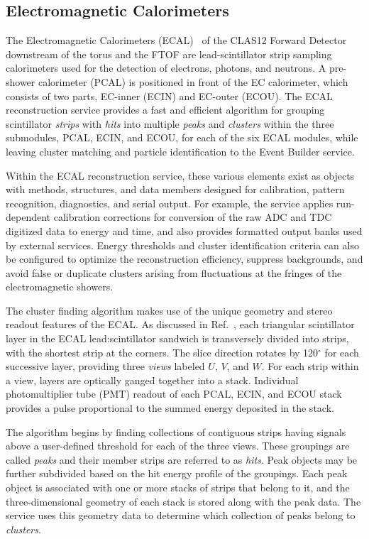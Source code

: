 \subsection{Electromagnetic Calorimeters}

The Electromagnetic Calorimeters (ECAL)~\cite{ecal-nim} of the CLAS12 Forward Detector downstream of the
torus and the FTOF are lead-scintillator strip sampling calorimeters used for the detection of electrons, photons,
and neutrons. A pre-shower calorimeter (PCAL) is positioned in front of the EC calorimeter, which consists of two
parts, EC-inner (ECIN) and EC-outer (ECOU). The ECAL reconstruction service provides a fast
and efficient algorithm for grouping scintillator {\it strips} with {\it hits} into multiple {\it peaks} and {\it clusters}
within the three submodules, PCAL, ECIN, and ECOU, for each of the six ECAL modules, while leaving cluster
matching and particle identification to the Event Builder service.

Within the ECAL reconstruction service, these various elements exist as objects with methods, structures, and data
members designed for calibration, pattern recognition, diagnostics, and serial output. For example, the service applies
run-dependent calibration corrections for conversion of the raw ADC and TDC digitized data to energy and time, and
also provides formatted output banks used by external services.  Energy thresholds and cluster identification criteria
can also be configured to optimize the reconstruction efficiency, suppress backgrounds, and avoid false or duplicate
clusters arising from fluctuations at the fringes of the electromagnetic showers.

The cluster finding algorithm makes use of the unique geometry and stereo readout features of the ECAL. As
discussed in Ref.~\cite{ecal-nim}, each triangular scintillator layer in the ECAL lead:scintillator sandwich is
transversely divided into strips, with the shortest strip at the corners. The slice direction rotates by 120$^\circ$
for each successive layer, providing three {\it views} labeled $U$, $V$, and $W$.  For each strip within a view,
layers are optically ganged together into a stack.  Individual photomultiplier tube (PMT) readout of each PCAL,
ECIN, and ECOU stack provides a pulse proportional to the summed energy deposited in the stack.

The algorithm begins by finding collections of contiguous strips having signals above a user-defined threshold for
each of the three views. These groupings are called {\it peaks} and their member strips are referred to as
{\it hits}.  Peak objects may be further subdivided based on the hit energy profile of the groupings. Each peak
object is associated with one or more stacks of strips that belong to it, and the three-dimensional geometry of each
stack is stored along with the peak data. The service uses this geometry data to determine which collection of
peaks belong to {\it clusters}.

